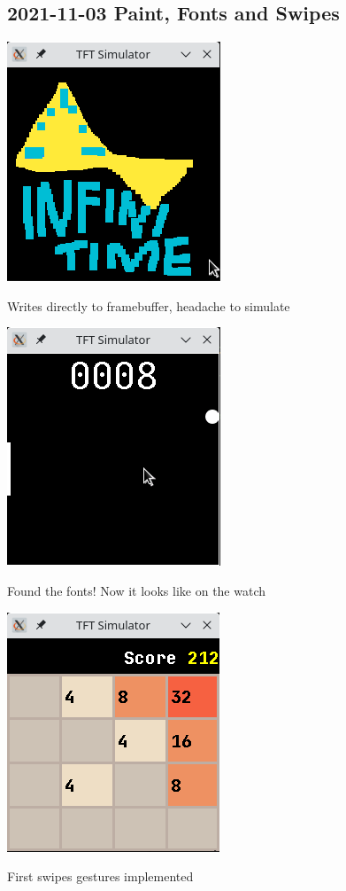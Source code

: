 \documentclass{beamer}
\begin{document}
\subsection{2021-11-03 Paint, Fonts and Swipes}
\begin{frame}{}
  \centering
  \includegraphics[height=0.8\paperheight]{../2021-11-03_InfiniPaint_logo.png}

  Writes directly to framebuffer, headache to simulate
\end{frame}
\begin{frame}{}
  \centering
  \includegraphics[height=0.8\paperheight]{../2021-11-03_Paddle_with_fonts.png}

  Found the fonts! Now it looks like on the watch
\end{frame}
\begin{frame}{}
  \centering
  \includegraphics[height=0.8\paperheight]{../2021-11-03_Twos_first_sim.png}

  First swipes gestures implemented
\end{frame}
\end{document}
